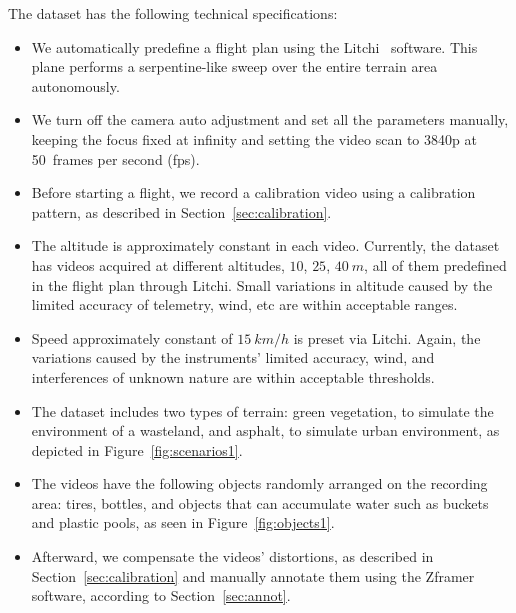 The dataset has the following technical specifications:
%
\begin{itemize}
  \item We automatically predefine a flight plan using the Litchi~\cite{web:litchi} software.
  This plane performs a serpentine-like sweep over the entire terrain area autonomously.
%
  \item We turn off the camera auto adjustment and set all the parameters manually,
  keeping the focus fixed at infinity and
  setting the video scan to 3840p at 50~frames per second (fps).
%
  \item Before starting a flight, we record a calibration video using a calibration pattern, as described in Section~\ref{sec:calibration}.
%
  \item The altitude is approximately constant in each video.
  Currently, the dataset has videos acquired at different altitudes, \eg $10$, $25$, $40~m$, all of them predefined in the flight plan through Litchi.
  Small variations in altitude caused by the limited accuracy of telemetry, wind, etc are within acceptable ranges.
%
  \item Speed approximately constant of $15~km/h$ is preset via Litchi.
  Again, the variations caused by the instruments' limited accuracy, wind, and interferences of unknown nature are within acceptable thresholds.
%
  \item The dataset includes two types of terrain: green vegetation, to simulate the environment of a wasteland, and asphalt, to simulate urban environment, as depicted in Figure~\ref{fig:scenarios1}.
%
  \item The videos have the following objects randomly arranged on the recording area: tires, bottles, and objects that can accumulate water such as buckets and plastic pools, as seen in Figure~\ref{fig:objects1}.
%
  \item Afterward, we compensate the videos' distortions, as described in Section~\ref{sec:calibration} and manually annotate them using the Zframer software, according to Section~\ref{sec:annot}.
%
\end{itemize}


